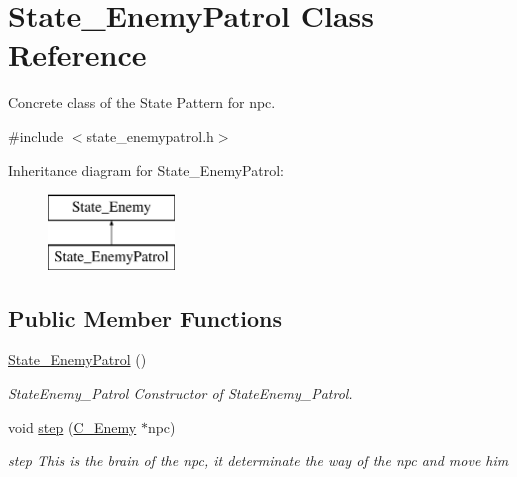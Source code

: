 \hypertarget{class_state___enemy_patrol}{}\section{State\+\_\+\+Enemy\+Patrol Class Reference}
\label{class_state___enemy_patrol}


Concrete class of the State Pattern for npc.  




{\ttfamily \#include $<$state\+\_\+enemypatrol.\+h$>$}

Inheritance diagram for State\+\_\+\+Enemy\+Patrol\+:\begin{figure}[H]
\begin{center}
\leavevmode
\includegraphics[height=2.000000cm]{class_state___enemy_patrol}
\end{center}
\end{figure}
\subsection*{Public Member Functions}
\begin{DoxyCompactItemize}
\item 
\hypertarget{class_state___enemy_patrol_a371d7b564b461655e8b489c205c62c5a}{}\hyperlink{class_state___enemy_patrol_a371d7b564b461655e8b489c205c62c5a}{State\+\_\+\+Enemy\+Patrol} ()\label{class_state___enemy_patrol_a371d7b564b461655e8b489c205c62c5a}

\begin{DoxyCompactList}\small\item\em State\+Enemy\+\_\+\+Patrol Constructor of State\+Enemy\+\_\+\+Patrol. \end{DoxyCompactList}\item 
void \hyperlink{class_state___enemy_patrol_a4a0fc7a5b704c011b41f05b1b86d34b3}{step} (\hyperlink{class_c___enemy}{C\+\_\+\+Enemy} $\ast$npc)
\begin{DoxyCompactList}\small\item\em step This is the brain of the npc, it determinate the way of the npc and move him \end{DoxyCompactList}\end{DoxyCompactItemize}


